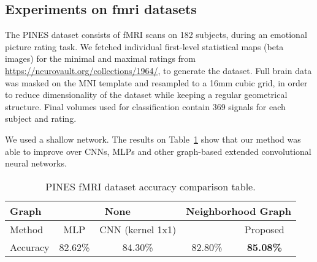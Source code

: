\subsection{Experiments on fmri datasets}

The PINES dataset consists of fMRI scans on 182 subjects, during an emotional picture rating task\cite{chang2015sensitive}. We fetched individual first-level statistical maps (beta images) for the minimal and maximal ratings from \url{https://neurovault.org/collections/1964/}, to generate the dataset. Full brain data was masked on the MNI template and resampled to a 16mm cubic grid, in order to reduce dimensionality of the dataset while keeping a regular geometrical structure. Final volumes used for classification contain 369 signals for each subject and rating. 

We used a shallow network. The results on Table~\ref{iaps-table} show that our method was able to improve over CNNs, MLPs and other graph-based extended convolutional neural networks.

\begin{table}[h]
\centering
\caption{PINES fMRI dataset accuracy comparison table.}
\label{iaps-table}
\begin{tabular}{|l||c|c||c|c|}
\hline
\multicolumn{1}{|l||}{Graph} & \multicolumn{2}{c||}{None} & \multicolumn{2}{c|}{Neighborhood Graph}     \\ \hline
Method                      & MLP & CNN (kernel 1x1)                                 & \cite{defferrard2016convolutional} & Proposed                   \\ \hline
Accuracy                    & 82.62\% & 84.30\%                            & 82.80\%                            & \textbf{85.08\%} \\ \hline
\end{tabular}
\vspace{-.4cm}
\end{table}

